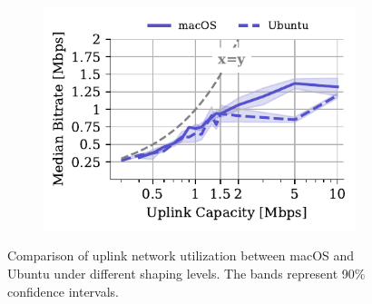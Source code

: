 \begin{figure}[]
\begin{subfigure}[t]{0.4\textwidth}
    \includegraphics[width=\textwidth,keepaspectratio]{figures/static_mac/uplink_Teams-Chrome_comparison.pdf}
    \caption{\teamsbrowser}
	\label{subfig:uplink_teams_chrome_bitrate_mac}
\end{subfigure}\hfill
\caption{Comparison of uplink network utilization between macOS and Ubuntu under different shaping levels. The bands represent 90\% confidence intervals.}
\label{fig:uplink_static_mac}
\end{figure}


